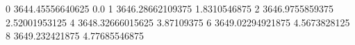 0 3644.45556640625 0.0
1 3646.28662109375 1.8310546875
2 3646.9755859375 2.52001953125
4 3648.32666015625 3.87109375
6 3649.02294921875 4.5673828125
8 3649.232421875 4.77685546875
